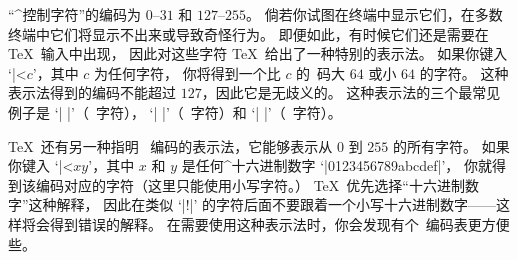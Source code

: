 {%
\ascii{}“^{控制字符}”的编码为 $0$--$31$ 和 $127$--$255$。
倘若你试图在终端中显示它们，在多数终端中它们将显示不出来或导致奇怪行为。
即便如此，有时候它们还是需要在 \TeX\ 输入中出现，
因此对这些字符 \TeX\ 给出了一种特别的表示法。
如果你键入 `|^^|$c$'，其中 $c$ 为任何字符，
你将得到一个比 $c$ 的\ascii\ 码大 $64$ 或小 $64$ 的字符。
这种表示法得到的编码不能超过 $127$，因此它是无歧义的。
这种表示法的三个最常见例子是 `|^^M|'（\ascii\ 字符），
`|^^J|'（\ascii\ 字符）和
`|^^I|'（\ascii\ 字符）。

\TeX\ 还有另一种指明 \ascii\ 编码的表示法，它能够表示从 $0$ 到 $255$ 的所有字符。
如果你键入 `|^^|$xy$'，其中 $x$ 和 $y$ 是任何^{十六进制数字} `|0123456789abcdef|'，
你就得到该编码对应的字符（这里只能使用小写字符。）
\TeX\ 优先选择“十六进制数字”这种解释，
因此在类似 `|^^a|' 的字符后面不要跟着一个小写十六进制数字——这样将会得到错误的解释。
在需要使用这种表示法时，你会发现有个\ascii\ 编码表更方便些。

}
